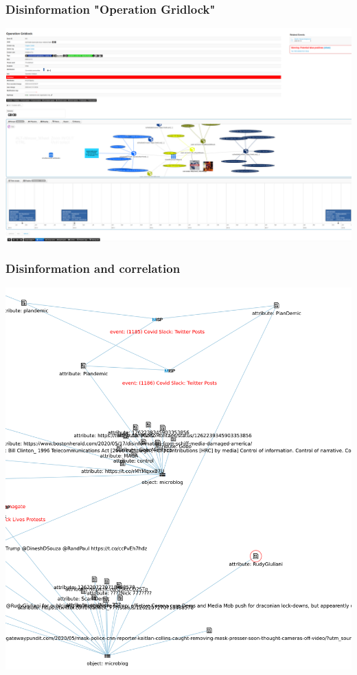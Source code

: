 \begin{frame}
    \frametitle{Disinformation "Operation Gridlock"}
    \includegraphics[width=1.00\linewidth]{operationgridlock.png}
\end{frame}

\begin{frame}
    \frametitle{Disinformation and correlation}
    \includegraphics[scale=0.14]{misinfo-correlation.png}
\end{frame}

